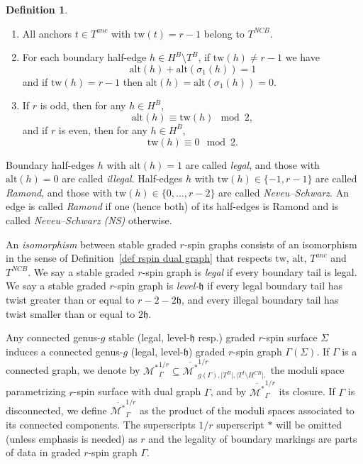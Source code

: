 \documentclass[11pt,a4paper]{article}
\theoremstyle{definition}
\newtheorem{definition}[dummy]{Definition}
\theoremstyle{remark}
\newcommand{\alt}{{\text{alt}}}
\newcommand{\tw}{\text{tw}}
\newcommand{\twE}{\text{tw}}
\numberwithin{equation}{section}
\def\Mstar{{{\mathcal M^*}}}
\def\Mbarstar{{\overline{\mathcal M^*}}}
\def\h{{\mathfrak h}}
\begin{document}
\begin{definition}
\begin{enumerate}[label=(\emph{\roman*})]
\item All anchors $t\in T^{anc}$ with $\tw(t)=r-1$ belong to $T^{NCB}$.

\item
\label{it:-1}For each boundary half-edge $h \in H^B \setminus T^B$, if $\twE(h) \neq r-1 $ we have
\[\alt(h) + \alt(\sigma_1(h)) = 1\]
and if $\twE(h) =r -1$ then $\alt(h) = \alt(\sigma_1(h)) = 0.$


\item
If $r$ is odd, then for any $h \in H^B$,
\[\alt(h) \equiv \twE(h) \mod 2,\]
and if $r$ is even, then for any $h \in H^B$,
\[\twE(h) \equiv 0 \mod 2.\]



\end{enumerate}
Boundary half-edges $h$ with $\alt(h) = 1$ are called \textit{legal}, and those with $\alt(h) = 0$ are called \textit{illegal}.  Half-edges $h$ with $\twE(h) \in \{-1, r-1\}$ are called \textit{Ramond}, and those with $\twE(h) \in \{0, \ldots, r-2\}$ are called \textit{Neveu--Schwarz}.  An edge is called \textit{Ramond} if one (hence both) of its half-edges is Ramond and is called \textit{Neveu--Schwarz (NS)} otherwise.
\end{definition}


An \textit{isomorphism} between  stable  graded $r$-spin graphs consists of an isomorphism in the sense of Definition~\ref{def rspin dual graph} that respects $\tw$, $\alt$, $T^{anc}$ and $T^{NCB}$.  
We say a stable graded $r$-spin graph is \textit{legal} if every boundary tail is legal. We say a stable graded $r$-spin graph is \textit{level-$\h$} if every legal boundary tail has twist greater than or equal to $r-2-2\h$, and every illegal boundary tail has twist smaller than or equal to $2\h$.

Any connected genus-$g$ stable (legal, level-$\h$ resp.) graded $r$-spin surface $\Sigma$ induces a connected genus-$g$ (legal, level-$\h$) graded $r$-spin graph $\Gamma(\Sigma)$. If $\Gamma$ is a connected graph, we denote by ${\Mstar}^{1/r}_{\Gamma}\subseteq \Mbarstar_{g(\Gamma), \lvert T^B\rvert,\lvert T^I\setminus H^{CB}\rvert,}^{1/r}$ the moduli space parametrizing $r$-spin surface with dual graph $\Gamma$, and by $\Mbarstar^{1/r}_{\Gamma}$ its closure.   
If $\Gamma$ is disconnected, we define $\Mbarstar^{1/r}_{\Gamma}$ as the product of the moduli spaces associated to its connected components. The superscripts $1/r$ superscript $*$ will be omitted (unless emphasis is needed) as $r$ and the legality of boundary markings are parts of data in graded $r$-spin graph $\Gamma$.
\end{document}
